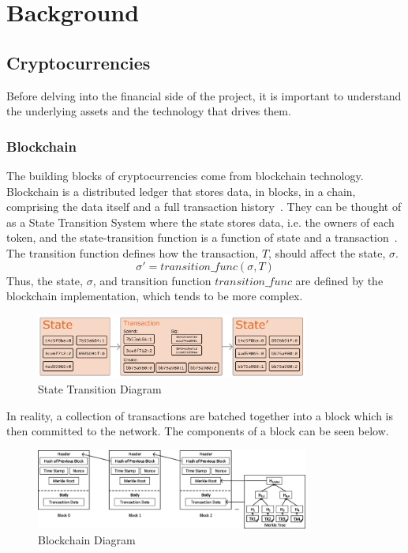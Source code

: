 \chapter{Background}
\section{Cryptocurrencies}
Before delving into the financial side of the project, it is important to understand the underlying assets and the technology that drives them.

\subsection{Blockchain}
The building blocks of cryptocurrencies come from blockchain technology. Blockchain is a distributed ledger that stores data, in blocks, in a chain, comprising the data itself and a full transaction history~\cite{nofer2017blockchain}. They can be thought of as a State Transition System where the state stores data, i.e. the owners of each token, and the state-transition function is a function of state and a transaction~\cite{ethereum_whitepaper}. The transition function defines how the transaction, $T$, should affect the state, $\sigma$. $$\sigma' = transition\_func(\sigma, T)$$Thus, the state, $\sigma$, and transition function $transition\_func$ are defined by the blockchain implementation, which tends to be more complex.

\begin{figure}[!htb]
    \centering
    \includegraphics[width=0.8\textwidth]{background/Images/ethereum-state-transition.png}
    \caption{State Transition Diagram~\cite{ethereum_whitepaper}}
\end{figure}

\noindent In reality, a collection of transactions are batched together into a block which is then committed to the network. The components of a block can be seen below.

\begin{figure}[!htb]
    \centering
    \includegraphics[width=0.8\textwidth]{background/Images/The-structure-of-a-Blockchain.png}
    \caption{Blockchain Diagram~\cite{inbookBlockchain}}
\end{figure}

